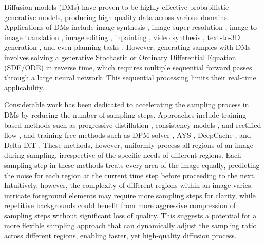 Diffusion models (DMs) \cite{Ho2020diffusion, Prafulla2024diffusionbeats, Yang2019Generative, Jascha2015deep} have proven to be highly effective probabilistic generative models, producing high-quality data across various domains. Applications of DMs include image synthesis \cite{rombach2022high, dhariwal2021diffusion}, image super-resolution \cite{li2022srdiff, yue2024resshift, gao2023implicit}, image-to-image translation \cite{wang2022pretraining, saharia2022palette, li2023bbdm}, image editing \cite{kawar2023imagic, zhang2023sine}, inpainting \cite{lugmayr2022repaint}, video synthesis \cite{blattmann2023align, esser2023structure}, text-to-3D generation \cite{poole2022dreamfusion}, and even planning tasks \cite{janner2022planning}. However, generating samples with DMs involves solving a generative Stochastic or Ordinary Differential Equation (SDE/ODE) \cite{protter2005stochastic, hartman2002ordinary} in reverse time, which requires multiple sequential forward passes through a large neural network. This sequential processing limits their real-time applicability.

Considerable work has been dedicated to accelerating the sampling process in DMs by reducing the number of sampling steps. Approaches include training-based methods such as progressive distillation \cite{salimansprogressive}, consistency models \cite{song2023consistency}, and rectified flow \cite{liu2022flow, albergo2022building, lipman2022flow}, and training-free methods such as DPM-solver \cite{lu2022dpm}, AYS \cite{sabouralign}, DeepCache \cite{xu2018deepcache}, and Delta-DiT \cite{chen2024delta}. These methods, however, uniformly process all regions of an image during sampling, irrespective of the specific needs of different regions. Each sampling step in these methods treats every area of the image equally, predicting the noise for each region at the current time step before proceeding to the next. Intuitively, however, the complexity of different regions within an image varies: intricate foreground elements may require more sampling steps for clarity, while repetitive backgrounds could benefit from more aggressive compression of sampling steps without significant loss of quality. This suggests a potential for a more flexible sampling approach that can dynamically adjust the sampling ratio across different regions, enabling faster, yet high-quality diffusion process.

